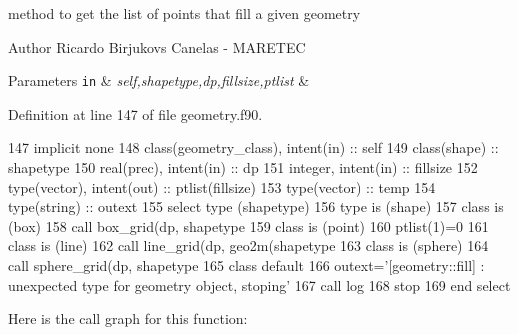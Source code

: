 method to get the list of points that fill a given geometry 

\begin{DoxyAuthor}{Author}
Ricardo Birjukovs Canelas -\/ M\+A\+R\+E\+T\+EC 
\end{DoxyAuthor}

\begin{DoxyParams}[1]{Parameters}
\mbox{\tt in}  & {\em self,shapetype,dp,fillsize,ptlist} & \\
\hline
\end{DoxyParams}


Definition at line 147 of file geometry.\+f90.


\begin{DoxyCode}
147     \textcolor{keywordtype}{implicit none}
148     \textcolor{keywordtype}{class}(geometry\_class), \textcolor{keywordtype}{intent(in)} :: self
149     \textcolor{keywordtype}{class}(shape) :: shapetype
150     \textcolor{keywordtype}{real(prec)}, \textcolor{keywordtype}{intent(in)} :: dp
151     \textcolor{keywordtype}{integer}, \textcolor{keywordtype}{intent(in)} :: fillsize
152     \textcolor{keywordtype}{type}(vector), \textcolor{keywordtype}{intent(out)} :: ptlist(fillsize)
153     \textcolor{keywordtype}{type}(vector) :: temp
154     \textcolor{keywordtype}{type}(string) :: outext
155     \textcolor{keywordflow}{select type} (shapetype)
156 \textcolor{keywordflow}{    type is} (shape)
157 \textcolor{keywordflow}{    class is} (box)
158         \textcolor{keyword}{call }box\_grid(dp, shapetype%
159 \textcolor{keywordflow}{    class is} (point)
160         ptlist(1)=0
161 \textcolor{keywordflow}{    class is} (line)
162         \textcolor{keyword}{call }line\_grid(dp, geo2m(shapetype%
163 \textcolor{keywordflow}{    class is} (sphere)
164         \textcolor{keyword}{call }sphere\_grid(dp, shapetype%
165 \textcolor{keywordflow}{        class default}
166         outext=\textcolor{stringliteral}{'[geometry::fill] : unexpected type for geometry object, stoping'}
167         \textcolor{keyword}{call }log%
168         stop
169 \textcolor{keywordflow}{    end select}
\end{DoxyCode}
Here is the call graph for this function\+:\nopagebreak
